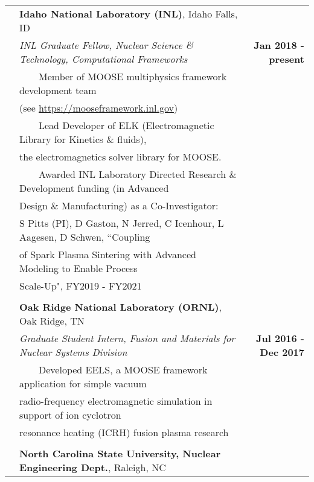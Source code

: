 \documentclass{article}
\newcommand{\tabitem}{~~\textbullet~~}
\begin{document}
\begin{tabularx}{\textwidth}{l X r}
	\hspace{2em} & \textbf{Idaho National Laboratory (INL)}, Idaho Falls, ID & \\
	& \textit{INL Graduate Fellow, Nuclear Science \& Technology, Computational Frameworks} & \textbf{Jan 2018 - present} \\
	& \tabitem Member of MOOSE multiphysics framework development team & \\
	& \hspace{1.5em} (see \url{https://mooseframework.inl.gov}) & \\
	& \tabitem Lead Developer of ELK (Electromagnetic Library for Kinetics \& fluids), & \\
	& \hspace{1.5em} the electromagnetics solver library for MOOSE. & \\
	& \tabitem Awarded INL Laboratory Directed Research \& Development funding (in Advanced & \\
	& \hspace{1.5em} Design \& Manufacturing) as a Co-Investigator: & \\
	& \hspace{2.5em} S Pitts (PI), D Gaston, N Jerred, C Icenhour, L Aagesen, D Schwen, ``Coupling & \\
	& \hspace{2.5em} of Spark Plasma Sintering with Advanced Modeling to Enable Process & \\
	& \hspace{2.5em} Scale-Up", FY2019 - FY2021 & \\
	& & \\
	& \textbf{Oak Ridge National Laboratory (ORNL)}, Oak Ridge, TN & \\
	& \textit{Graduate Student Intern, Fusion and Materials for Nuclear Systems Division} & \textbf{Jul 2016 - Dec 2017} \\
	& \tabitem Developed EELS, a MOOSE framework application for simple vacuum & \\
	& \hspace{1.5em} radio-frequency electromagnetic simulation in support of ion cyclotron & \\
	& \hspace{1.5em} resonance heating (ICRH) fusion plasma research & \\
	& & \\
	& \textbf{North Carolina State University, Nuclear Engineering Dept.}, Raleigh, NC & \\

\end{tabularx}
\end{document}
